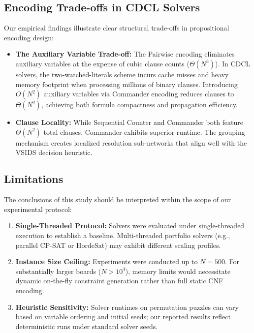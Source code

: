 \documentclass[a4paper,fleqn]{cas-sc}
\begin{document}
\subsection{Encoding Trade-offs in CDCL Solvers}
Our empirical findings illustrate clear structural trade-offs in propositional encoding design:
\begin{itemize}
    \item \textbf{The Auxiliary Variable Trade-off:} The Pairwise encoding eliminates auxiliary variables at the expense of cubic clause counts ($\Theta(N^3)$). In CDCL solvers, the two-watched-literals scheme incurs cache misses and heavy memory footprint when processing millions of binary clauses. Introducing $O(N^2)$ auxiliary variables via Commander encoding reduces clauses to $\Theta(N^2)$, achieving both formula compactness and propagation efficiency.
    \item \textbf{Clause Locality:} While Sequential Counter and Commander both feature $\Theta(N^2)$ total clauses, Commander exhibits superior runtime. The grouping mechanism creates localized resolution sub-networks that align well with the VSIDS decision heuristic.
\end{itemize}

\subsection{Limitations}
The conclusions of this study should be interpreted within the scope of our experimental protocol:
\begin{enumerate}
    \item \textbf{Single-Threaded Protocol:} Solvers were evaluated under single-threaded execution to establish a baseline. Multi-threaded portfolio solvers (e.g., parallel CP-SAT or HordeSat) may exhibit different scaling profiles.
    \item \textbf{Instance Size Ceiling:} Experiments were conducted up to $N = 500$. For substantially larger boards ($N > 10^4$), memory limits would necessitate dynamic on-the-fly constraint generation rather than full static CNF encoding.
    \item \textbf{Heuristic Sensitivity:} Solver runtimes on permutation puzzles can vary based on variable ordering and initial seeds; our reported results reflect deterministic runs under standard solver seeds.
\end{enumerate}

\end{document}
